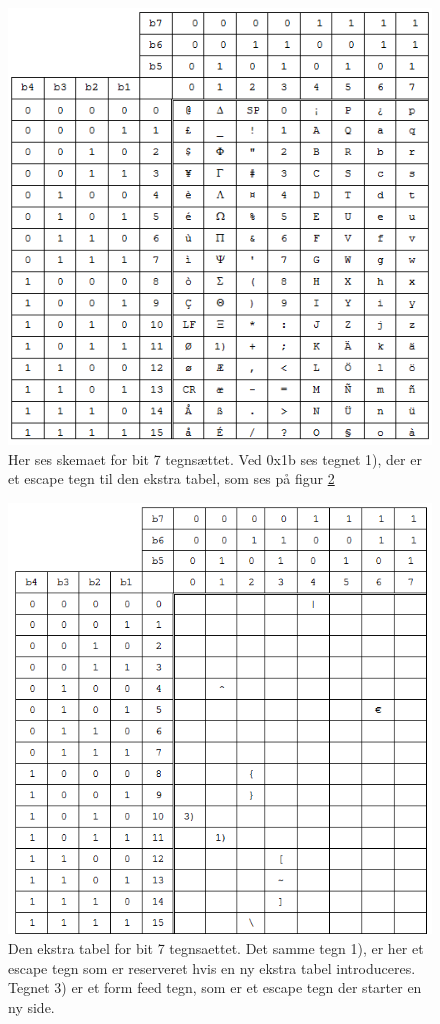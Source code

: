 \begin{figure}[H]
\includegraphics []{Billeder/tegnsaet.png}
\caption {Her ses skemaet for bit 7 tegnsættet. Ved 0x1b ses tegnet 1), der er et escape tegn til den ekstra tabel, som ses på figur \ref{tegnsaet2}}
\label {tegnsaet}
\end{figure}

\begin{figure}[H]
\includegraphics []{Billeder/tegnsaet2.png}
\caption {Den ekstra tabel for bit 7 tegnsaettet. Det samme tegn 1), er her et escape tegn som er reserveret hvis en ny ekstra tabel introduceres. Tegnet 3) er et form feed tegn, som er et escape tegn der starter en ny side.}
\label {tegnsaet2}
\end{figure}

